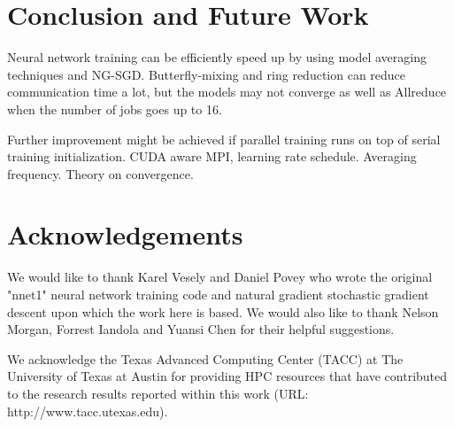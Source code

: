 \documentclass{article}
\begin{document}
\section{Conclusion and Future Work}
Neural network training can be efficiently speed up by using model averaging techniques and NG-SGD. 
Butterfly-mixing and ring reduction can reduce communication time a lot, but the models may not converge as well as 
Allreduce when the number of jobs goes up to 16.

Further improvement might be achieved if parallel training runs on top of serial training initialization.
CUDA aware MPI, learning rate schedule. Averaging frequency. Theory on convergence.

\section{Acknowledgements}
We would like to thank Karel Vesely and Daniel Povey who wrote the original "nnet1" neural network training code
and natural gradient stochastic gradient descent upon which the work here is based. We would also like to thank Nelson 
Morgan, Forrest Iandola and Yuansi Chen for their helpful suggestions. 

We acknowledge the Texas Advanced Computing Center (TACC) at The University of Texas at Austin for providing 
HPC resources that have contributed to the research results reported within this work (URL: http://www.tacc.utexas.edu).



\end{document}
